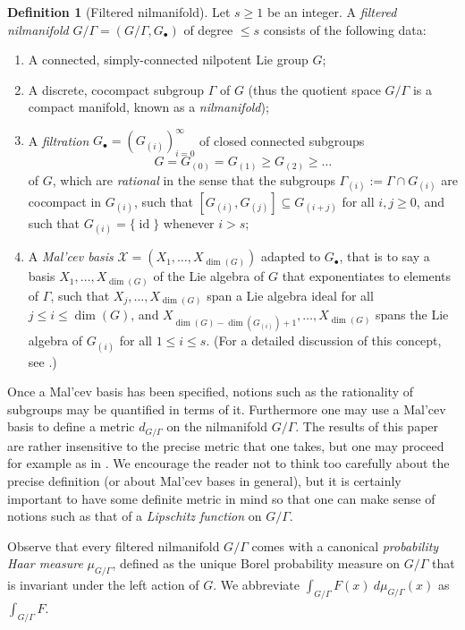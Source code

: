 \documentclass[11pt,reqno]{amsart}
\numberwithin{equation}{section}
\theoremstyle{plain}
\theoremstyle{definition}
\newtheorem{definition}[subsection]{Definition}
\renewcommand{\leq}{\leqslant}
\renewcommand{\geq}{\geqslant}
\newcommand\1{{\bf 1}}
\newcommand\2{{\bf 2}}
\newcommand\id{\operatorname{id}}
\begin{document}
\begin{definition}[Filtered nilmanifold] Let $s \geq 1$ be an integer.  A \emph{filtered nilmanifold} $G/\Gamma = (G/\Gamma, G_\bullet)$ of degree $\leq s$ consists of the following data:
\begin{enumerate}
\item A connected, simply-connected nilpotent Lie group $G$;
\item A discrete, cocompact subgroup $\Gamma$ of $G$ (thus the quotient space $G/\Gamma$ is a compact manifold, known as a \emph{nilmanifold});
\item A \emph{filtration} $G_\bullet = (G_{(i)})_{i=0}^\infty$ of closed connected subgroups
$$ G = G_{(0)} = G_{(1)} \geq G_{(2)} \geq \ldots$$
of $G$, which are \emph{rational} in the sense that the subgroups $\Gamma_{(i)} := \Gamma \cap G_{(i)}$ are cocompact in $G_{(i)}$, such that $[G_{(i)},G_{(j)}] \subseteq G_{(i+j)}$ for all $i,j \geq 0$, and such that $G_{(i)}=\{\id\}$ whenever $i>s$;
\item A \emph{Mal'cev basis} $\mathcal{X} = (X_1,\ldots,X_{\dim(G)})$ adapted to $G_{\bullet}$, that is to say a basis $X_1,\ldots,X_{\dim(G)}$ of the Lie algebra of $G$ that exponentiates to elements of $\Gamma$, such that $X_j,\ldots,X_{\dim(G)}$ span a Lie algebra ideal for all $j \leq i \leq \dim(G)$, and $X_{\dim(G)-\dim(G_{(i)})+1},\ldots,X_{\dim(G)}$ spans the Lie algebra of $G_{(i)}$ for all $1 \leq i \leq s$. (For a detailed discussion of this concept, see \cite[\S 2]{green-tao-nilratner}.)
\end{enumerate}
\end{definition}

Once a Mal'cev basis has been specified, notions such as the rationality of subgroups may be quantified in terms of it. Furthermore one may use a Mal'cev basis to define a metric $d_{G/\Gamma}$ on the nilmanifold $G/\Gamma$. The results of this paper are rather insensitive to the precise metric that one takes, but one may proceed for example as in \cite[Definition 2.2]{green-tao-nilratner}. We encourage the reader not to think too carefully about the precise definition (or about Mal'cev bases in general), but it is certainly important to have some definite metric in mind so that one can make sense of notions such as that of a \emph{Lipschitz function} on $G/\Gamma$.

Observe that every filtered nilmanifold $G/\Gamma$ comes with a canonical \emph{probability Haar measure} $\mu_{G/\Gamma}$, defined as the unique Borel probability measure on $G/\Gamma$ that is invariant under the left action of $G$.  We abbreviate $\int_{G/\Gamma} F(x)\ d\mu_{G/\Gamma}(x)$ as $\int_{G/\Gamma} F$.
\end{document}
